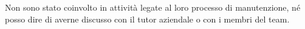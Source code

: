 

Non sono stato coinvolto in attività legate al loro processo di manutenzione, né posso dire di averne discusso con il tutor aziendale o con i membri del team.